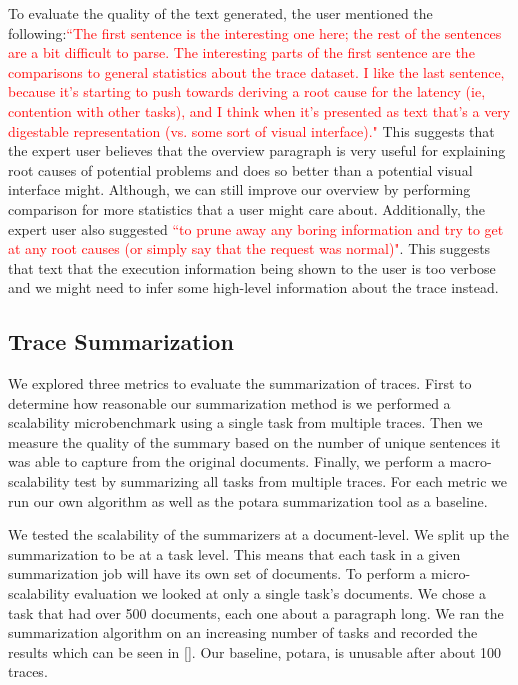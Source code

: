  To evaluate the quality of the text generated, the user mentioned the following:\textcolor{red}{``The first sentence is the interesting one here; the rest of the sentences are a bit difficult to parse.
The interesting parts of the first sentence are the comparisons to general statistics about the trace dataset.  I like the last sentence, because it's starting to push towards deriving a 
root cause for the latency (ie, contention with other tasks), and I think when it's presented as text that's a very digestable representation (vs. some sort of visual interface)."}
This suggests that the expert user believes that the overview paragraph is very useful for explaining root causes of potential problems and does so better than a potential
visual interface might. Although, we can still improve our overview by performing comparison for more statistics that a user might care about. Additionally,
the expert user also suggested \textcolor{red}{``to prune away any boring information and try to get at any root causes (or simply say that the request was normal)"}. This suggests
that text that the execution information being shown to the user is too verbose and we might need to infer some high-level information about the trace instead.

\subsection{Trace Summarization}

We explored three metrics to evaluate the summarization of traces. 
First to determine how reasonable our summarization method is we performed a scalability microbenchmark using a single task from multiple traces. 
Then we measure the quality of the summary based on the number of unique sentences it was able to capture from the original documents.
Finally, we perform a macro-scalability test by summarizing all tasks from multiple traces. For each metric we run our own algorithm as well as the potara summarization tool 
as a baseline.

 We tested the scalability of the summarizers at a document-level. We split up the summarization to be at a task level. 
This means that each task in a given summarization job will have its own set of documents. 
To perform a micro-scalability evaluation we looked at only a single task's documents. We chose a task that had over 500 documents, each one about a paragraph long. 
We ran the summarization algorithm on an increasing number of tasks and recorded the results which can be seen in \autoref{}. Our baseline, potara, is unusable after
about 100 traces. 

